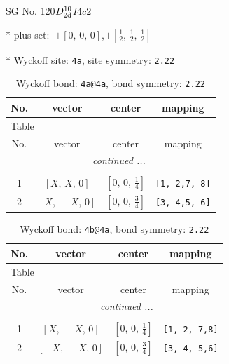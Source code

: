 \documentclass[fleqn,8pt]{jsarticle}
\begin{document}
\setcounter{MaxMatrixCols}{32}

\renewcommand{\tablename}{Table~}
\renewcommand{\figurename}{Figure~}
\begin{center}
\LARGE
SG No. 120\quad$D_{\rm 2d}^{10}$\quad$I\bar{4}c2$\quad[ tetragonal ]
\end{center}

* plus set:\,\,\,$+\left[ 0,\, 0,\, 0 \right]$,\quad $+\left[ \frac{1}{2},\, \frac{1}{2},\, \frac{1}{2} \right]$


* Wyckoff site: {\tt 4a}, site symmetry: {\tt 2.22}
\renewcommand{\arraystretch}{1.2}
\begin{longtable}{cccc}
\caption{Wyckoff bond: {\tt 4a@4a}, bond symmetry: {\tt 2.22}}
 \\
 \hline \hline
No. & vector & center & mapping \\ \hline \endfirsthead

\multicolumn{3}{l}{\tablename\ \thetable{}} \\
 \hline \hline
No. & vector & center & mapping \\ \hline \endhead

 \hline \hline
\multicolumn{3}{r}{\footnotesize\it continued ...} \\ \endfoot

 \hline \hline
\multicolumn{3}{r}{} \\ \endlastfoot

1 & $\left[ X,\, X,\, 0 \right]$ & $\left[ 0,\, 0,\, \frac{1}{4} \right]$ & {\tt [1,-2,7,-8]} \\ \hline
2 & $\left[ X,\, - X,\, 0 \right]$ & $\left[ 0,\, 0,\, \frac{3}{4} \right]$ & {\tt [3,-4,5,-6]} \\
\end{longtable}
\renewcommand{\arraystretch}{1.2}
\begin{longtable}{cccc}
\caption{Wyckoff bond: {\tt 4b@4a}, bond symmetry: {\tt 2.22}}
 \\
 \hline \hline
No. & vector & center & mapping \\ \hline \endfirsthead

\multicolumn{3}{l}{\tablename\ \thetable{}} \\
 \hline \hline
No. & vector & center & mapping \\ \hline \endhead

 \hline \hline
\multicolumn{3}{r}{\footnotesize\it continued ...} \\ \endfoot

 \hline \hline
\multicolumn{3}{r}{} \\ \endlastfoot

1 & $\left[ X,\, - X,\, 0 \right]$ & $\left[ 0,\, 0,\, \frac{1}{4} \right]$ & {\tt [1,-2,-7,8]} \\ \hline
2 & $\left[ - X,\, - X,\, 0 \right]$ & $\left[ 0,\, 0,\, \frac{3}{4} \right]$ & {\tt [3,-4,-5,6]} \\
\end{longtable}
\end{document}
